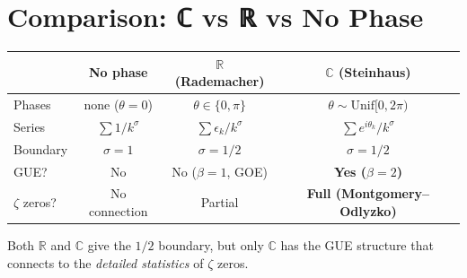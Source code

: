 \documentclass[11pt]{article}
\begin{document}
\section{Comparison: ℂ vs ℝ vs No Phase}

\begin{center}
\renewcommand{\arraystretch}{1.3}
\begin{tabular}{lccc}
\hline
& \textbf{No phase} & \textbf{$\mathbb{R}$ (Rademacher)} & \textbf{$\mathbb{C}$ (Steinhaus)} \\
\hline
Phases & none ($\theta = 0$) & $\theta \in \{0, \pi\}$ & $\theta \sim \mathrm{Unif}[0,2\pi)$ \\
Series & $\sum 1/k^\sigma$ & $\sum \epsilon_k / k^\sigma$ & $\sum e^{i\theta_k}/k^\sigma$ \\
Boundary & $\sigma = 1$ & $\sigma = 1/2$ & $\sigma = 1/2$ \\
GUE? & No & No ($\beta = 1$, GOE) & \textbf{Yes ($\beta = 2$)} \\
$\zeta$ zeros? & No connection & Partial & \textbf{Full (Montgomery--Odlyzko)} \\
\hline
\end{tabular}
\end{center}

Both $\mathbb{R}$ and $\mathbb{C}$ give the $1/2$ boundary,
but only $\mathbb{C}$ has the GUE structure that connects to the
\emph{detailed statistics} of $\zeta$ zeros.
\end{document}
